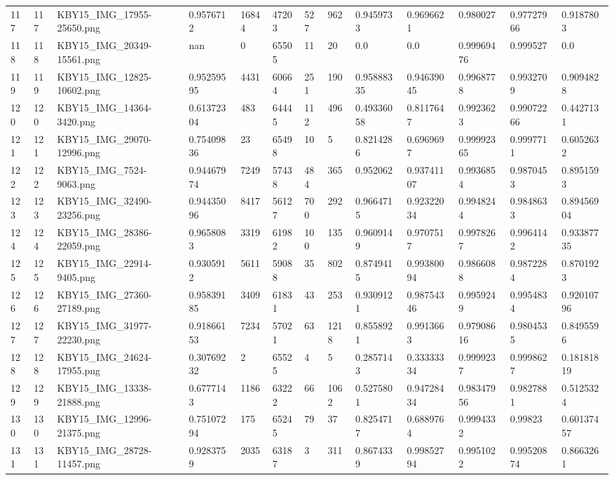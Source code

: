 \documentclass[11pt, a4paper, twoside]{report}
\begin{document}
\begin{longtable}[c]{@{}lllllllllllll@{}}
117 & 117 & KBY15\_IMG\_17955-25650.png & 0.9576712 & 16844 & 47203 & 527 & 962 & 0.9459733 & 0.9696621 & 0.980027 & 0.97727966 & 0.9187803 \\
118 & 118 & KBY15\_IMG\_20349-15561.png & nan & 0 & 65505 & 11 & 20 & 0.0 & 0.0 & 0.99969476 & 0.999527 & 0.0 \\
119 & 119 & KBY15\_IMG\_12825-10602.png & 0.95259595 & 4431 & 60664 & 251 & 190 & 0.95888335 & 0.94639045 & 0.9968778 & 0.9932709 & 0.9094828 \\
120 & 120 & KBY15\_IMG\_14364-3420.png & 0.61372304 & 483 & 64445 & 112 & 496 & 0.49336058 & 0.8117647 & 0.9923623 & 0.99072266 & 0.4427131 \\
121 & 121 & KBY15\_IMG\_29070-12996.png & 0.75409836 & 23 & 65498 & 10 & 5 & 0.8214286 & 0.6969697 & 0.99992365 & 0.9997711 & 0.6052632 \\
122 & 122 & KBY15\_IMG\_7524-9063.png & 0.94467974 & 7249 & 57438 & 484 & 365 & 0.952062 & 0.93741107 & 0.9936854 & 0.9870453 & 0.8951593 \\
123 & 123 & KBY15\_IMG\_32490-23256.png & 0.94435096 & 8417 & 56127 & 700 & 292 & 0.9664715 & 0.92322034 & 0.9948244 & 0.9848633 & 0.89456904 \\
124 & 124 & KBY15\_IMG\_28386-22059.png & 0.9658083 & 3319 & 61982 & 100 & 135 & 0.9609149 & 0.9707517 & 0.9978267 & 0.9964142 & 0.93387735 \\
125 & 125 & KBY15\_IMG\_22914-9405.png & 0.9305912 & 5611 & 59088 & 35 & 802 & 0.8749415 & 0.99380094 & 0.9866088 & 0.9872284 & 0.8701923 \\
126 & 126 & KBY15\_IMG\_27360-27189.png & 0.95839185 & 3409 & 61831 & 43 & 253 & 0.9309121 & 0.98754346 & 0.9959249 & 0.9954834 & 0.92010796 \\
127 & 127 & KBY15\_IMG\_31977-22230.png & 0.91866153 & 7234 & 57021 & 63 & 1218 & 0.8558921 & 0.9913663 & 0.97908616 & 0.9804535 & 0.8495596 \\
128 & 128 & KBY15\_IMG\_24624-17955.png & 0.30769232 & 2 & 65525 & 4 & 5 & 0.2857143 & 0.33333334 & 0.9999237 & 0.9998627 & 0.18181819 \\
129 & 129 & KBY15\_IMG\_13338-21888.png & 0.6777143 & 1186 & 63222 & 66 & 1062 & 0.5275801 & 0.94728434 & 0.98347956 & 0.9827881 & 0.5125324 \\
130 & 130 & KBY15\_IMG\_12996-21375.png & 0.75107294 & 175 & 65245 & 79 & 37 & 0.8254717 & 0.6889764 & 0.9994332 & 0.99823 & 0.60137457 \\
131 & 131 & KBY15\_IMG\_28728-11457.png & 0.9283759 & 2035 & 63187 & 3 & 311 & 0.8674339 & 0.99852794 & 0.9951022 & 0.99520874 & 0.8663261 \\

\end{longtable}
\end{document}
